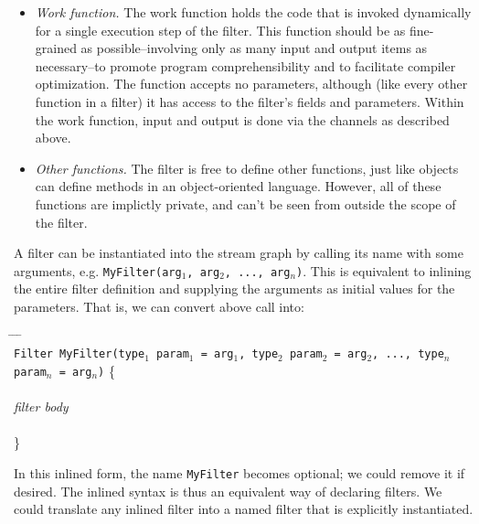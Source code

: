 \begin{itemize}
\item {\it Work function.}  The work function holds the code that is
invoked dynamically for a single execution step of the filter.  This
function should be as fine-grained as possible--involving only as many
input and output items as necessary--to promote program
comprehensibility and to facilitate compiler optimization.  The
function accepts no parameters, although (like every other function in
a filter) it has access to the filter's fields and parameters.  Within
the work function, input and output is done via the channels as
described above.

\item {\it Other functions.}  The filter is free to define other
functions, just like objects can define methods in an object-oriented
language.  However, all of these functions are implictly private, and
can't be seen from outside the scope of the filter.

\end{itemize}

\medskip
{}
\medskip

A filter can be instantiated into the stream graph by calling its name
with some arguments, e.g. {\tt MyFilter(arg$_1$, arg$_2$, ...,
arg$_n$)}.  This is equivalent to inlining the entire filter
definition and supplying the arguments as initial values for the
parameters.  That is, we can convert above call into:

\begin{tabbing}
\hspace{0.2in} \= \hspace{0.2in} \= \hspace{0.2in} \= \hspace{0.2in} \= \\

{\tt Filter MyFilter(type$_1$ param$_1$ = arg$_1$, type$_2$ param$_2$
= arg$_2$, ..., type$_n$ param$_n$ = arg$_n$)} \{ \\ \\

\> {\it filter body} \\ \\
\}
\end{tabbing}

In this inlined form, the name {\tt MyFilter} becomes optional; we
could remove it if desired.  The inlined syntax is thus an equivalent
way of declaring filters.  We could translate any inlined filter into
a named filter that is explicitly instantiated.

